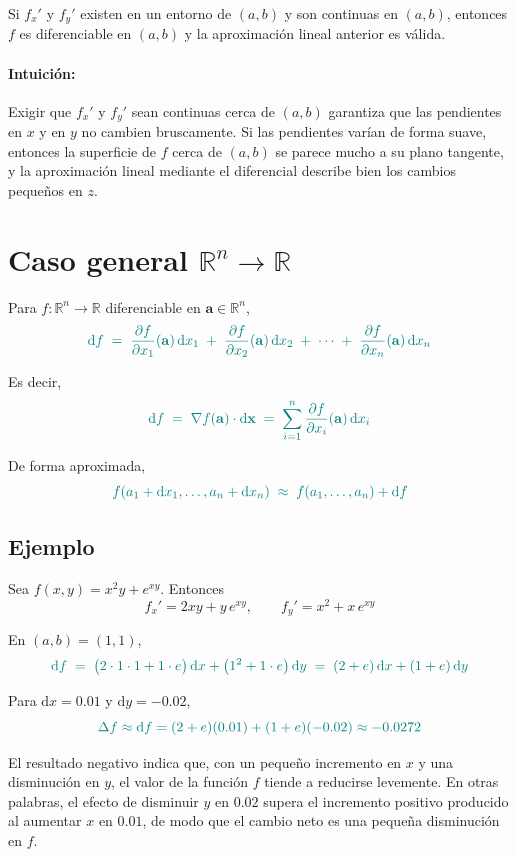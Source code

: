 \documentclass{article}
\begin{document}
Si \(f_x'\) y \(f_y'\) existen en un entorno de \((a,b)\) y son continuas en \((a,b)\), entonces \(f\) es diferenciable en \((a,b)\) y la aproximación lineal anterior es válida.

\paragraph*{Intuición:}
Exigir que \(f_x'\) y \(f_y'\) sean continuas cerca de \((a,b)\) garantiza que las pendientes en \(x\) y en \(y\) no cambien bruscamente.
Si las pendientes varían de forma suave, entonces la superficie de \(f\) cerca de \((a,b)\) se parece mucho a su plano tangente, y la aproximación lineal mediante el diferencial describe bien los cambios pequeños en \(z\).


\section*{Caso general \(\mathbb{R}^n\to\mathbb{R}\)}

Para \(f:\mathbb{R}^n\to\mathbb{R}\) diferenciable en \(\mathbf{a}\in\mathbb{R}^n\),
\[
\color{teal}
\mathrm{d}f
\;=\;
\frac{\partial f}{\partial x_1}(\mathbf{a})\,\mathrm{d}x_1
\;+\;
\frac{\partial f}{\partial x_2}(\mathbf{a})\,\mathrm{d}x_2
\;+\;
\cdots
\;+\;
\frac{\partial f}{\partial x_n}(\mathbf{a})\,\mathrm{d}x_n
\]

Es decir,
\[
\color{teal}
\mathrm{d}f
\;=\;
\nabla f(\mathbf{a})\cdot \mathrm{d}\mathbf{x}
\;=\;
\sum_{i=1}^{n}
\frac{\partial f}{\partial x_i}(\mathbf{a})\,\mathrm{d}x_i
\]

De forma aproximada,
\[
\color{teal}
f(a_1+\mathrm{d}x_1,\dots,a_n+\mathrm{d}x_n)
\;\approx\;
f(a_1,\dots,a_n)
+
\mathrm{d}f
\]


\subsection*{Ejemplo}

Sea \(f(x,y)=x^{2}y + e^{xy}\). Entonces
\[
f_x'=2xy + y\,e^{xy},
\qquad
f_y'=x^2 + x\,e^{xy}
\]

En \((a,b)=(1,1)\),
\[
\color{teal}
\mathrm{d}f
\;=\;
\bigl(2\cdot1\cdot1 + 1\cdot e\bigr)\,\mathrm{d}x
+
\bigl(1^2 + 1\cdot e\bigr)\,\mathrm{d}y
\;=\;
(2+e)\,\mathrm{d}x
+
(1+e)\,\mathrm{d}y
\]

Para \(\mathrm{d}x=0.01\) y \(\mathrm{d}y=-0.02\),
\[
\color{teal}
\Delta f
\approx
\mathrm{d}f
=
(2+e)(0.01)
+
(1+e)(-0.02)
\approx
-0.0272
\]

El resultado negativo indica que, con un pequeño incremento en \(x\) y una disminución en \(y\), el valor de la función \(f\) tiende a reducirse levemente.
En otras palabras, el efecto de disminuir \(y\) en \(0.02\) supera el incremento positivo producido al aumentar \(x\) en \(0.01\), de modo que el cambio neto es una pequeña disminución en \(f\).
\end{document}
